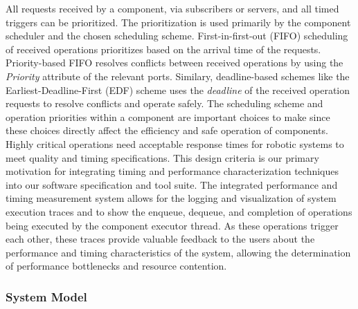 All requests received by a component, via subscribers or servers, and
all timed triggers can be prioritized. The prioritization is used
primarily by the component scheduler and the chosen scheduling
scheme. First-in-first-out (FIFO) scheduling of received operations
prioritizes based on the arrival time of the requests. Priority-based
FIFO resolves conflicts between received operations by using the
\emph{Priority} attribute of the relevant ports. Similary,
deadline-based schemes like the Earliest-Deadline-First (EDF) scheme
uses the \emph{deadline} of the received operation requests to resolve
conflicts and operate safely. The scheduling scheme and operation
priorities within a component are important choices to make since
these choices directly affect the efficiency and safe operation of
components. Highly critical operations need acceptable response times
for robotic systems to meet quality and timing specifications. This
design criteria is our primary motivation for integrating timing and
performance characterization techniques into our software
specification and tool suite.  The integrated performance and timing
measurement system allows for the logging and visualization of system
execution traces and to show the enqueue, dequeue, and completion of
operations being executed by the component executor thread.  As these
operations trigger each other, these traces provide valuable feedback
to the users about the performance and timing characteristics of the
system, allowing the determination of performance bottlenecks and
resource contention.

\subsubsection{System Model} 


